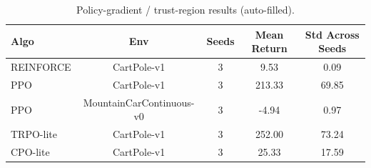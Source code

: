 \begin{table}[h]
\centering
\caption{Policy-gradient / trust-region results (auto-filled).}
\label{tab:policyresults}
\begin{tabular}{lcccc}
\toprule
Algo & Env & Seeds & Mean Return & Std Across Seeds \\
\midrule
REINFORCE & CartPole-v1 & 3 & 9.53 & 0.09 \\
PPO & CartPole-v1 & 3 & 213.33 & 69.85 \\
PPO & MountainCarContinuous-v0 & 3 & -4.94 & 0.97 \\
TRPO-lite & CartPole-v1 & 3 & 252.00 & 73.24 \\
CPO-lite & CartPole-v1 & 3 & 25.33 & 17.59 \\
\bottomrule
\end{tabular}
\end{table}
